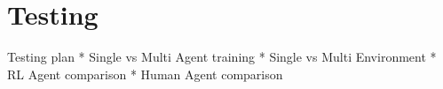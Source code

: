 \chapter{Testing}\label{ch:testing-of-the-implementation}


Testing plan
 * Single vs Multi Agent training
 * Single vs Multi Environment
 * RL Agent comparison
 * Human Agent comparison
